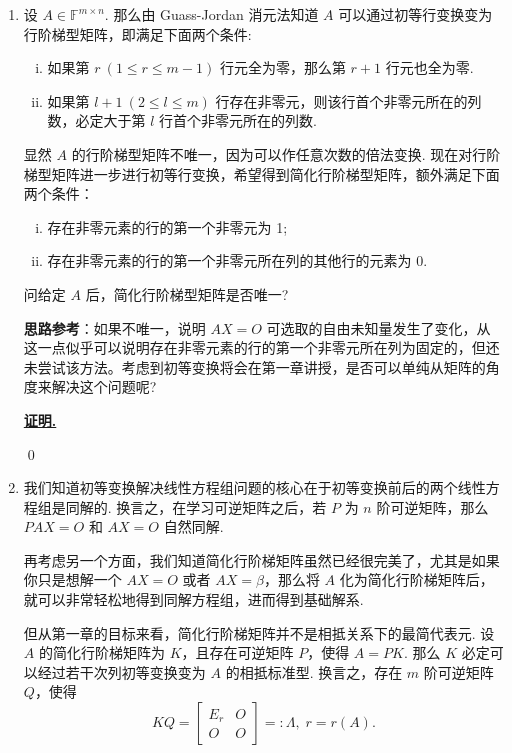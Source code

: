 \documentclass{ctexart}
\renewenvironment{proof}[1][证明]{\par\underline{\textbf{#1.}} \;\fangsong}{\qed\par}
\begin{document}
\pagestyle{fancy}
\lhead{}
\rhead{\today}


\begin{enumerate}[1.]
	
\item 设 \( A \in \mathbb{F}^{m \times n} \). 那么由 Guass-Jordan 消元法知道 \( A \) 可以通过初等行变换变为行阶梯型矩阵，即满足下面两个条件:
\begin{enumerate}[(i)]
	\item 如果第 \( r \ (1 \leq r \leq m-1) \) 行元全为零，那么第 \( r+1 \) 行元也全为零.
	\item 如果第 \( l+1 \ (2 \leq l \leq m) \) 行存在非零元，则该行首个非零元所在的列数，必定大于第 \( l \) 行首个非零元所在的列数.
\end{enumerate}

显然 \( A \) 的行阶梯型矩阵不唯一，因为可以作任意次数的倍法变换. 现在对行阶梯型矩阵进一步进行初等行变换，希望得到简化行阶梯型矩阵，额外满足下面两个条件：
\begin{enumerate}[(i)]
	\item 存在非零元素的行的第一个非零元为 1;
	\item 存在非零元素的行的第一个非零元所在列的其他行的元素为 0.
\end{enumerate}

问给定 \( A \) 后，简化行阶梯型矩阵是否唯一? 

\textbf{思路参考}：如果不唯一，说明 \( AX=O \) 可选取的自由未知量发生了变化，从这一点似乎可以说明存在非零元素的行的第一个非零元所在列为固定的，但还未尝试该方法。考虑到初等变换将会在第一章讲授，是否可以单纯从矩阵的角度来解决这个问题呢?

\begin{proof}
	
\end{proof}

\newpage


\item 我们知道初等变换解决线性方程组问题的核心在于初等变换前后的两个线性方程组是同解的. 换言之，在学习可逆矩阵之后，若 \( P \) 为 \( n \) 阶可逆矩阵，那么 \( PAX=O \) 和 \( AX=O \) 自然同解. 

再考虑另一个方面，我们知道简化行阶梯矩阵虽然已经很完美了，尤其是如果你只是想解一个 \( AX=O \) 或者 \( AX=\beta \)，那么将 \( A \) 化为简化行阶梯矩阵后，就可以非常轻松地得到同解方程组，进而得到基础解系. 

但从第一章的目标来看，简化行阶梯矩阵并不是相抵关系下的最简代表元. 设 \( A \) 的简化行阶梯矩阵为 \( K \)，且存在可逆矩阵 \( P \)，使得 \( A=PK \). 那么 \( K \) 必定可以经过若干次列初等变换变为 \( A \) 的相抵标准型. 换言之，存在 \( m \) 阶可逆矩阵 \( Q \)，使得 
\[ KQ=\begin{bmatrix}
	E_r & O \\
	O & O
\end{bmatrix}=: \Lambda, \; r=r(A). \]


\end{enumerate}
\end{document}
